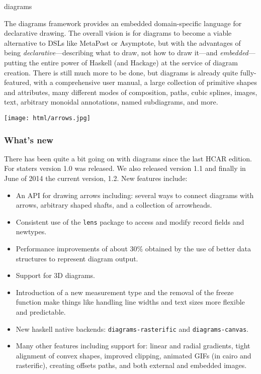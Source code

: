 \begin{hcarentry}[updated]{diagrams}

\makeheader

The diagrams framework provides an embedded domain-specific language
for declarative drawing.  The overall vision is for diagrams to become
a viable alternative to DSLs like MetaPost or Asymptote, but with the
advantages of being \emph{declarative}---describing what to draw, not
how to draw it---and \emph{embedded}---putting the entire power of
Haskell (and Hackage) at the service of diagram creation.  There is
still much more to be done, but diagrams is already quite
fully-featured, with a comprehensive user manual, a large collection
of primitive shapes and attributes, many different modes of
composition, paths, cubic splines, images, text, arbitrary monoidal
annotations, named subdiagrams, and more.

\begin{center}
\texttt{[image: html/arrows.jpg]}
\end{center}

\subsubsection*{What's new}

There has been quite a bit going on with diagrams since the last
HCAR edition. For staters version 1.0 was released.
We also released version 1.1 and finally in June of 2014
the current version, 1.2.
New features include:
\begin{itemize}
\item An API for drawing arrows including: several ways to connect diagrams
  with arrows, arbitrary shaped shafts, and a collection of arrowheads.
\item Consistent use of the \texttt{lens} package to access and modify 
  record fields and newtypes.
\item Performance improvements of about 30\% obtained by the use
  of better data structures to represent diagram output.
\item Support for 3D diagrams.
\item Introduction of a new measurement type and the removal of the
  freeze function make things like handling line widths and text sizes
  more flexible and predictable.
\item New haskell native backends: \texttt{diagrams-rasterific} and
  \texttt{diagrams-canvas}. 
\item Many other features including support for: linear and radial gradients, tight alignment of convex
  shapes, improved clipping, animated GIFs (in cairo and rasterific), creating offsets paths,
  and both external and embedded images.
\end{itemize}


\end{hcarentry}

